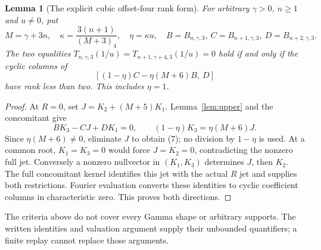 \documentclass[11pt]{article}
\newtheorem{lemma}{Lemma}
\begin{document}
\begin{lemma}[The explicit cubic offset-four rank form]
\label{lem:cubic-offset-four}
For arbitrary $\gamma>0$, $n\ge1$ and $u\ne0$, put
\[
 M=\gamma+3n,\quad \kappa=\frac{3(n+1)}{(M+3)_4},\quad
 \eta=\kappa u,\quad B=B_{n,\gamma,3},\
 C=B_{n+1,\gamma,3},\ D=B_{n+2,\gamma,3}.
\]
The two equalities
$T_{n,\gamma,3}(1/u)=T_{n+1,\gamma+4,3}(1/u)=0$
hold if and only if the cyclic columns of
\[
                 [(1-\eta)C-\eta(M+6)B,\ D]              \tag{7}
\]
have rank less than two. This includes $\eta=1$.
\end{lemma}
\begin{proof}
At $R=0$, set $J=K_2+(M+5)K_1$.
Lemma~\ref{lem:upper} and the concomitant give
\[
 B K_3-CJ+DK_1=0,\qquad
 (1-\eta)K_3=\eta(M+6)J.
\]
Since $\eta(M+6)\ne0$, eliminate $J$ to obtain (7);
no division by $1-\eta$ is used.
At a common root, $K_1=K_3=0$ would force $J=K_2=0$,
contradicting the nonzero full jet.
Conversely a nonzero nullvector in $(K_1,K_3)$ determines $J$,
then $K_2$. The full concomitant kernel identifies this jet with
the actual $R$ jet and supplies both restrictions.
Fourier evaluation converts these identities to cyclic coefficient
columns in characteristic zero. This proves both directions.
\end{proof}

The criteria above do not cover every Gamma shape or arbitrary supports.
The written identities and valuation argument supply their unbounded
quantifiers; a finite replay cannot replace those arguments.
\end{document}
